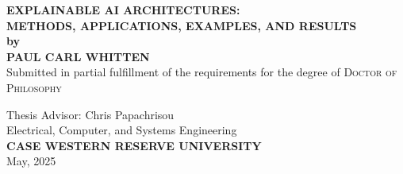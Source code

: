 \documentclass[12pt, oneside]{book}
\begin{document}


\begin{titlepage}
\begin{center}
\Large{\bfseries\MakeUppercase{
    Explainable AI Architectures:\\Methods, Applications, Examples, and Results\\
 }}
 \vspace{.5cm}
 \large{\bfseries{by}}\\
 \vspace{.5cm}
\Large{\bfseries\MakeUppercase{Paul Carl Whitten}}\\

\vspace{1cm}
\large{Submitted in partial fulfillment of the requirements for the degree of \textsc{\large{{Doctor of Philosophy}}}} \\[0.75cm]
\vfill

{Thesis Advisor: Chris Papachrisou} \vspace{0.4cm} \\[.75cm]
 \vfill
\large{Electrical, Computer, and Systems Engineering}\\[.75cm]
\vfill
\large{\bfseries\MakeUppercase{Case Western Reserve University}}\\[0.5cm]
\vfill
{May, 2025}
\end{center}
\end{titlepage}
\end{document}

